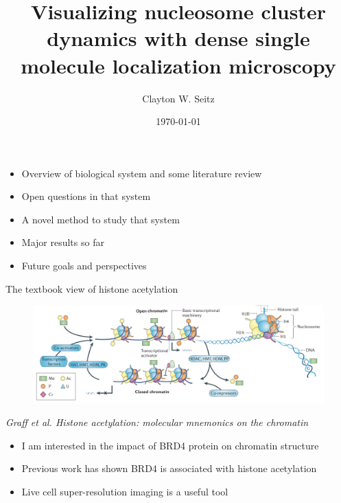 \documentclass{beamer}					%
\title{Visualizing nucleosome cluster dynamics with dense single molecule localization microscopy}	%
\author{Clayton W. Seitz}								%
\date{\today}									%
\begin{document}
\begin{frame}
  \titlepage
\end{frame}


%


\begin{frame}
\begin{itemize}
\item Overview of biological system and some literature review
\item Open questions in that system
\item A novel method to study that system
\item Major results so far
\item Future goals and perspectives
\end{itemize}
\end{frame}


\begin{frame}{The textbook view of histone acetylation}
\begin{figure}
\includegraphics[width=13cm]{Histones.png}
\end{figure}
\textit{Graff et al. Histone acetylation: molecular
mnemonics on the chromatin}
\vspace{0.1in}
\begin{itemize}
\item I am interested in the impact of BRD4 protein on chromatin structure
\item Previous work has shown BRD4 is associated with histone acetylation
\item Live cell super-resolution imaging is a useful tool
\end{itemize}
\end{frame}
\end{document}
